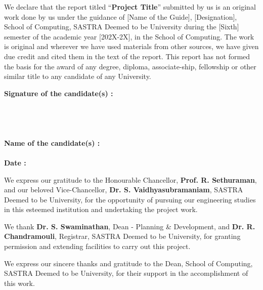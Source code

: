 \documentclass[a4paper, 12pt, oneside]{sastra_cse}
\begin{document}
	
	\declaration
	
	\begin{singlespace}
		
		We declare that the report titled ``\textbf{Project Title}'' submitted by us is an original work done by us under the guidance of [Name of the Guide], [Designation], School of Computing, SASTRA Deemed to be University during the [Sixth] semester of the academic year [202X-2X], in the School of Computing. The work is original and wherever we have used materials from other sources, we have given due credit and cited them in the text of the report. This report has not formed the basis for the award of any degree, diploma, associate-ship, fellowship or other similar title to any candidate of any University.\\
		
	\end{singlespace}
	\vspace*{0.1in}
	\noindent \textbf{Signature of the candidate(s)	:}	
	\\
	\\
	\\
	\\
	\\
    \noindent\textbf{Name of the candidate(s)	:}
    \\
    \\
	\noindent\textbf{Date\hspace*{43.5mm}					:}
	
	\acknowledgements
\hspace*{12pt}
We express our gratitude to the Honourable Chancellor, \textbf{Prof. R. Sethuraman}, and our beloved Vice-Chancellor, \textbf{Dr. S. Vaidhyasubramaniam}, SASTRA Deemed to be University, for the opportunity of pursuing our engineering studies in this esteemed institution and undertaking the project work.

\par We thank \textbf{Dr. S. Swaminathan}, Dean - Planning \& Development, and \textbf{Dr. R. Chandramouli}, Registrar, SASTRA Deemed to be University, for granting permission and extending facilities to carry out this project.

\par We express our sincere thanks and gratitude to the Dean, School of Computing, SASTRA Deemed to be University, for their support in the accomplishment of this work.
\end{document}

